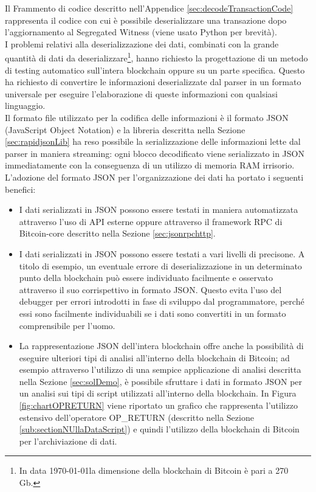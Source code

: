 Il Frammento di codice descritto nell'Appendice \ref{sec:decodeTransactionCode} rappresenta il codice con cui è possibile deserializzare una transazione dopo l'aggiornamento al Segregated Witness (viene usato Python per brevità).\\
I problemi relativi alla deserializzazione dei dati, combinati con la grande quantità di dati da deserializzare\footnote{In data \today la dimensione della blockchain di Bitcoin è pari a 270 Gb.}, hanno richiesto la progettazione di un metodo di testing automatico sull'intera blockchain oppure su un parte specifica.
Questo ha richiesto di convertire le informazioni deserializzate dal parser in un formato universale per eseguire l'elaborazione di queste informazioni con qualsiasi linguaggio.\\
Il formato file utilizzato per la codifica delle informazioni è il formato JSON (JavaScript Object Notation) e la libreria  descritta nella Sezione \ref{sec:rapidjsonLib} ha reso possibile la serializzazione delle informazioni lette dal parser in maniera streaming: ogni blocco decodificato viene serializzato in JSON immediatamente con la conseguenza di un utilizzo di memoria RAM irrisorio.\\
L'adozione del formato JSON per l'organizzazione dei dati ha portato i seguenti benefici:
\begin{itemize}
  \item I dati serializzati in JSON possono essere testati in maniera automatizzata attraverso l'uso di API esterne oppure attraverso il framework RPC di Bitcoin-core descritto nella Sezione \ref{sec:jsonrpchttp}.
  \item I dati serializzati in JSON possono essere testati a vari livelli di precisone. A titolo di esempio, un eventuale errore di deserializzazione in un determinato punto della blockchain può essere individuato facilmente e osservato attraverso il suo corrispettivo in formato JSON.
  Questo evita l'uso del debugger per errori introdotti in fase di sviluppo dal programmatore, perché essi sono facilmente individuabili se i dati sono convertiti in un formato comprensibile per l'uomo.
  \item La rappresentazione JSON dell'intera blockchain offre anche la possibilità di eseguire ulteriori tipi di analisi all'interno della blockchain di Bitcoin; ad esempio attraverso l'utilizzo di una sempice applicazione di analisi descritta nella Sezione \ref{sec:solDemo}, è possibile sfruttare i dati in formato JSON per un analisi sui tipi di script utilizzati all'interno della blockchain.
  In Figura \ref{fig:chartOPRETURN} viene riportato un grafico che rappresenta l'utilizzo estensivo dell'operatore OP\_RETURN (descritto nella Sezione \ref{sub:sectionNUllaDataScript}) e quindi l'utilizzo della blockchain di Bitcoin per l'archiviazione di dati.
\end{itemize}

